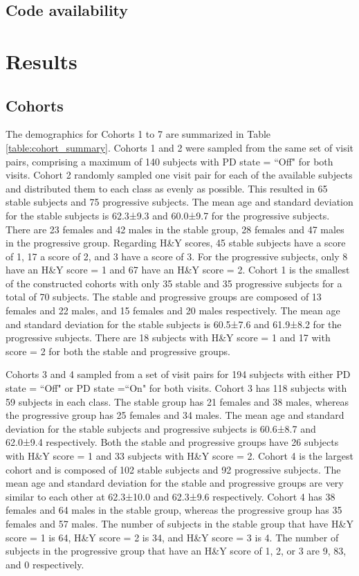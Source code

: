 \documentclass[10pt,letterpaper]{article}
\begin{document}
\subsection*{Code availability}

\section*{Results}

\subsection*{Cohorts}

The demographics for Cohorts 1 to 7 are summarized in Table \ref{table:cohort_summary}. Cohorts 1 and 2 were sampled from the same set of visit pairs, comprising a 
maximum of 140 subjects with PD state = ``Off" for both visits. Cohort 2 randomly sampled one visit pair for each of the available subjects and 
distributed them to each class as evenly as possible. This resulted in 65 stable subjects and 75 progressive subjects. The mean age and standard deviation for the stable subjects 
is 62.3±9.3 and 60.0±9.7 for the progressive subjects. There are 23 females and 42 males in the stable group, 28 females and 47 males in the progressive group. 
Regarding H\&Y scores, 45 stable subjects have a score of 1, 17 a score of 2, and 3 have a score of 3. For the progressive subjects, only 8 have an H\&Y 
score = 1 and 67 have an H\&Y score = 2. Cohort 1 is the smallest of the constructed cohorts with only 35 stable and 35 progressive subjects for a total of 70 
subjects. The stable and progressive groups are composed of 13 females and 22 males, and 15 females and 20 males respectively. The mean age and standard deviation for the stable 
subjects is 60.5±7.6 and 61.9±8.2 for the progressive subjects. There are 18 subjects with H\&Y score = 1 and 17 with score = 2 for both the stable and progressive 
groups.

Cohorts 3 and 4 sampled from a set of visit pairs for 194 subjects with either PD state = ``Off" or PD state =``On" for both visits. Cohort 3 has 118 subjects with 
59 subjects in each class. The stable group has 21 females and 38 males, whereas the progressive group has 25 females and 34 males. The mean age and standard deviation for the stable 
subjects and progressive subjects is 60.6±8.7 and 62.0±9.4 respectively. Both the stable and progressive groups have 26 subjects with H\&Y score = 1 and 33 subjects 
with H\&Y score = 2. Cohort 4 is the largest cohort and is composed of 102 stable subjects and 92 progressive subjects. The mean age and standard deviation for the 
stable and progressive groups are very similar to each other at 62.3±10.0 and 62.3±9.6 respectively. Cohort 4 has 38 females and 64 males in the stable group, whereas the 
progressive group has 35 females and 57 males. The number of subjects in the stable group that have H\&Y score = 1 is 64, H\&Y score = 2 is 34, and H\&Y score = 3 is 4. 
The number of subjects in the progressive group that have an H\&Y score of 1, 2, or 3 are 9, 83, and 0 respectively.
\end{document}
